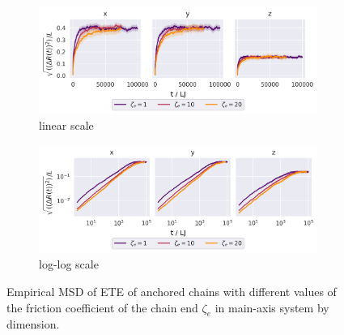 \documentclass[
    paper=A4,pagesize=automedia,fontsize=12pt,
    BCOR=15mm,DIV=22,
    twoside,headinclude,footinclude=false,
    fleqn,             %
    bibliography=totocnumbered,          %
    listof=totoc,                %
    listof=flat,                 %
    cleardoublepage=empty      %
    numbers=endperiod
]{scrartcl}
\begin{document}
\begin{figure}
    \centering
    \begin{subfigure}[b]{\textwidth}
        \centering
        \includegraphics[width=\textwidth]{14+15+16-exp-msd-dim.png}
        \caption{linear scale}
        \label{fig:msd_anchored_zeta-dim-normal}
    \end{subfigure}
    \begin{subfigure}[b]{\textwidth}
        \centering
        \includegraphics[width=\textwidth]{14+15+16-exp-msd-dim-log.png}
        \caption{log-log scale}
        \label{fig:msd_anchored_zeta-dim-log}
    \end{subfigure}
    \caption{
        Empirical MSD of ETE of anchored chains with different values of
        the friction coefficient of the chain end $\zeta_e$ in main-axis system
        by dimension.
    }
    \label{fig:msd_anchored_zeta-dim}
\end{figure}
\end{document}
